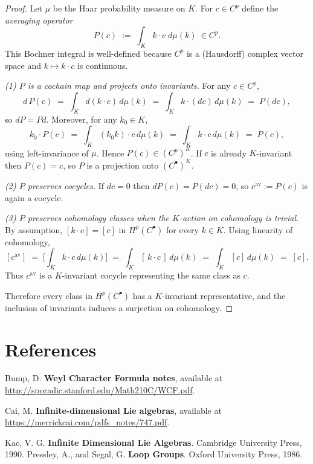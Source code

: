 \documentclass[12pt]{article}
\begin{document}
\begin{proof}
    Let $\mu$ be the Haar probability measure on $K$. For $c\in C^p$ define the
    \emph{averaging operator}
    \[
        P(c)\;:=\;\int_{K} k\cdot c\; d\mu(k)\ \in C^p.
    \]
    This Bochner integral is well-defined because $C^p$ is a (Hausdorff) complex
    vector space and $k\mapsto k\cdot c$ is continuous.

    \smallskip

    \emph{(1) $P$ is a cochain map and projects onto invariants.}
    For any $c\in C^p$,
    \[
        d\,P(c)\;=\;\int_K d(k\cdot c)\,d\mu(k)\;=\;\int_K k\cdot (dc)\,d\mu(k)\;=\;P(dc),
    \]
    so $dP=Pd$. Moreover, for any $k_0\in K$,
    \[
        k_0\cdot P(c)\;=\;\int_K (k_0k)\cdot c\,d\mu(k)\;=\;\int_K k\cdot c\,d\mu(k)\;=\;P(c),
    \]
    using left-invariance of $\mu$. Hence $P(c)\in (C^p)^K$. If $c$ is already
    $K$-invariant then $P(c)=c$, so $P$ is a projection onto $(C^\bullet)^K$.

    \smallskip

    \emph{(2) $P$ preserves cocycles.}
    If $dc=0$ then $dP(c)=P(dc)=0$, so $c^{\mathrm{av}}:=P(c)$ is again a cocycle.

    \smallskip

    \emph{(3) $P$ preserves cohomology classes when the $K$-action on cohomology is trivial.}
    By assumption, $[k\cdot c]=[c]$ in $H^p(C^\bullet)$ for every $k\in K$. Using linearity
    of cohomology,
    \[
        [c^{\mathrm{av}}]\;=\;\Big[\int_K k\cdot c\,d\mu(k)\Big]
        \;=\;\int_K [\,k\cdot c\,]\,d\mu(k)
        \;=\;\int_K [c]\,d\mu(k)
        \;=\;[c].
    \]
    Thus $c^{\mathrm{av}}$ is a $K$-invariant cocycle representing the same class as $c$.

    Therefore every class in $H^p(C^\bullet)$ has a $K$-invariant representative,
    and the inclusion of invariants induces a surjection on cohomology.
\end{proof}


\section{References}
\begin{enumerate}
     Bump, D. \textbf{Weyl Character Formula notes}, available at \url{http://sporadic.stanford.edu/Math210C/WCF.pdf}.

     Cai, M. \textbf{Infinite-dimensional Lie algebras}, available at \url{https://merrickcai.com/pdfs_notes/747.pdf}.

     Kac, V. G. \textbf{Infinite Dimensional Lie Algebras}. Cambridge University Press, 1990.
     Pressley, A., and Segal, G. \textbf{Loop Groups}. Oxford University Press, 1986.
\end{enumerate}
\end{document}
